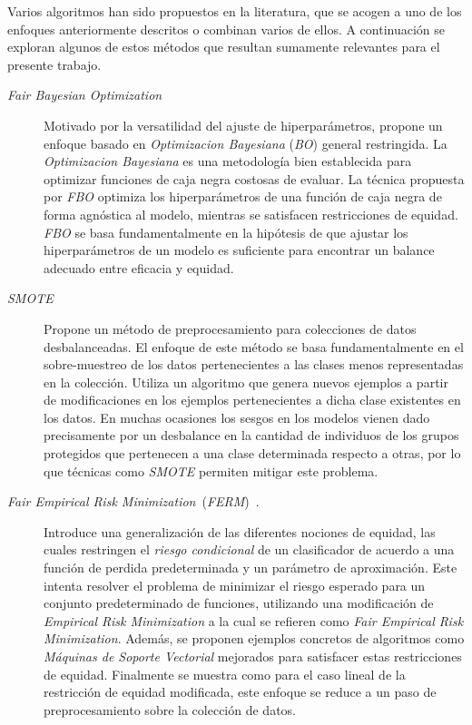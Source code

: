 Varios algoritmos han sido propuestos en la literatura, que se acogen a uno de los enfoques anteriormente descritos o combinan varios de ellos.
A continuación se exploran algunos de estos métodos que resultan sumamente relevantes para el presente trabajo.

\begin{description}

\item[\emph{Fair Bayesian Optimization}~\parencite{perrone2021fbo}]
Motivado por la versatilidad del ajuste de hiperparámetros, propone un enfoque basado en \emph{Optimizacion Bayesiana} (\emph{BO}) general restringida.
La \emph{Optimizacion Bayesiana} es una metodología bien establecida para optimizar funciones de caja negra costosas de evaluar.
La técnica propuesta por \emph{FBO} optimiza los hiperparámetros de una función de caja negra de forma agnóstica al modelo, mientras se satisfacen restricciones de equidad.
\emph{FBO} se basa fundamentalmente en la hipótesis de que ajustar los hiperparámetros de un modelo es suficiente para encontrar un balance adecuado entre eficacia y equidad.

\item[\emph{SMOTE} \parencite{chawla2002smote}]
Propone un método de preprocesamiento para colecciones de datos desbalanceadas.
El enfoque de este método se basa fundamentalmente en el sobre-muestreo de los datos pertenecientes a las clases menos representadas en la colección.
Utiliza un algoritmo que genera nuevos ejemplos a partir de modificaciones en los ejemplos pertenecientes a dicha clase existentes en los datos.
En muchas ocasiones los sesgos en los modelos vienen dado precisamente por un desbalance en la cantidad de individuos de los grupos protegidos que pertenecen a una clase determinada respecto a otras, por lo que técnicas como \emph{SMOTE} permiten mitigar este problema.

\item[\emph{Fair Empirical Risk Minimization}~(\emph{FERM})~\parencite{FERM}.]
Introduce una generalización de las diferentes nociones de equidad, las cuales restringen el \emph{riesgo condicional} de un clasificador de acuerdo a una función de perdida predeterminada y un parámetro de aproximación.
Este intenta resolver el problema de minimizar el riesgo esperado para un conjunto predeterminado de funciones, utilizando una modificación de \emph{Empirical Risk Minimization} a la cual se refieren como \emph{Fair Empirical Risk Minimization}.
Además, se proponen ejemplos concretos de algoritmos como \emph{Máquinas de Soporte Vectorial} mejorados para satisfacer estas restricciones de equidad.
Finalmente se muestra como para el caso lineal de la restricción de equidad modificada, este enfoque se reduce a un paso de preprocesamiento sobre la colección de datos. %


\end{description}
